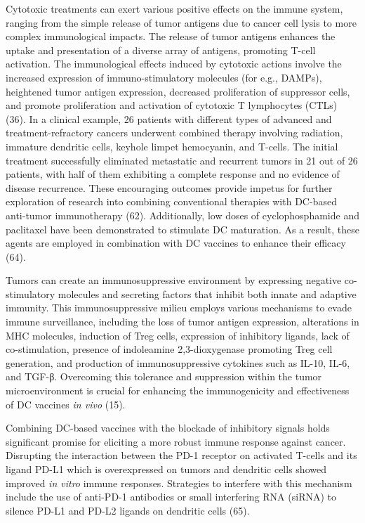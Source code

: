 \documentclass[
]{article}
\begin{document}
Cytotoxic treatments can exert various positive effects on the immune
system, ranging from the simple release of tumor antigens due to cancer
cell lysis to more complex immunological impacts. The release of tumor
antigens enhances the uptake and presentation of a diverse array of
antigens, promoting T-cell activation. The immunological effects induced
by cytotoxic actions involve the increased expression of
immuno-stimulatory molecules (for e.g., DAMPs), heightened tumor antigen
expression, decreased proliferation of suppressor cells, and promote
proliferation and activation of cytotoxic T lymphocytes (CTLs) (36). In
a clinical example, 26 patients with different types of advanced and
treatment-refractory cancers underwent combined therapy involving
radiation, immature dendritic cells, keyhole limpet hemocyanin, and
T-cells. The initial treatment successfully eliminated metastatic and
recurrent tumors in 21 out of 26 patients, with half of them exhibiting
a complete response and no evidence of disease recurrence. These
encouraging outcomes provide impetus for further exploration of research
into combining conventional therapies with DC-based anti-tumor
immunotherapy (62). Additionally, low doses of cyclophosphamide and
paclitaxel have been demonstrated to stimulate DC maturation. As a
result, these agents are employed in combination with DC vaccines to
enhance their efficacy (64).

Tumors can create an immunosuppressive environment by expressing
negative co-stimulatory molecules and secreting factors that inhibit
both innate and adaptive immunity. This immunosuppressive milieu employs
various mechanisms to evade immune surveillance, including the loss of
tumor antigen expression, alterations in MHC molecules, induction of
Treg cells, expression of inhibitory ligands, lack of co-stimulation,
presence of indoleamine 2,3-dioxygenase promoting Treg cell generation,
and production of immunosuppressive cytokines such as IL-10, IL-6, and
TGF-β. Overcoming this tolerance and suppression within the tumor
microenvironment is crucial for enhancing the immunogenicity and
effectiveness of DC vaccines \emph{in vivo} (15).

Combining DC-based vaccines with the blockade of inhibitory signals
holds significant promise for eliciting a more robust immune response
against cancer. Disrupting the interaction between the PD-1 receptor on
activated T-cells and its ligand PD-L1 which is overexpressed on tumors
and dendritic cells showed improved \emph{in vitro} immune responses.
Strategies to interfere with this mechanism include the use of anti-PD-1
antibodies or small interfering RNA (siRNA) to silence PD-L1 and PD-L2
ligands on dendritic cells (65).
\end{document}
